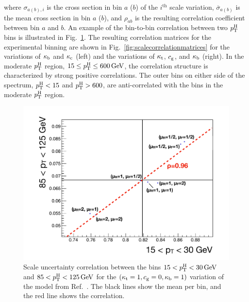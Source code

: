 % 
where $\sigma_{a (b), i}$ is the cross section in bin $a$ ($b$) of the $i^\text{th}$ scale variation, $\overline{\sigma}_{a (b)}$ is the mean cross section in bin $a$ ($b$), and $\rho_{ab}$ is the resulting correlation coefficient between bin $a$ and $b$.
% 
An example of the bin-to-bin correlation between two $p_\mathrm{T}^\mathrm{H}$ bins is illustrated in Fig.~\ref{fig:corrplot}.
% 
The resulting correlation matrices for the experimental binning are shown in Fig.~\ref{fig:scalecorrelationmatrices} for the variations of $\kappa_{\mathrm{b}}$ and $\kappa_{\mathrm{c}}$ (left) and the variations of $\kappa_{\mathrm{t}}$, $c_\mathrm{g}$, and $\kappa_{\mathrm{b}}$ (right).
% 
In the moderate $p_\mathrm{T}^\mathrm{H}$ region, $15 \leq p_\mathrm{T}^\mathrm{H} \leq 600\,\text{GeV}$, the correlation structure is characterized by strong positive correlations.
% 
The outer bins on either side of the spectrum, $p_\mathrm{T}^\mathrm{H}<15$ and $p_\mathrm{T}^\mathrm{H}>600$\GeV, are anti-correlated with the bins in the moderate $p_\mathrm{T}^\mathrm{H}$ region.

\begin{figure}[hbtp]
  \begin{center}
    \includegraphics[width=\halflinewidth]{img/interpretation/other/corrplot.pdf}
    \caption{
        Scale uncertainty correlation between the bins $15 < p_\mathrm{T}^\mathrm{H} < 30\,\text{GeV}$ and $85 < p_\mathrm{T}^\mathrm{H} < 125\,\text{GeV}$ for the $(\kappa_{\mathrm{t}}=1, c_\mathrm{g}=0, \kappa_{\mathrm{b}}=1)$ variation of the model from Ref.~\cite{Grazzini:2017szg,Grazzini:2016paz}.
        The black lines show the mean per bin, and the red line shows the correlation.
        }
    \label{fig:corrplot}
  \end{center}
\end{figure}

